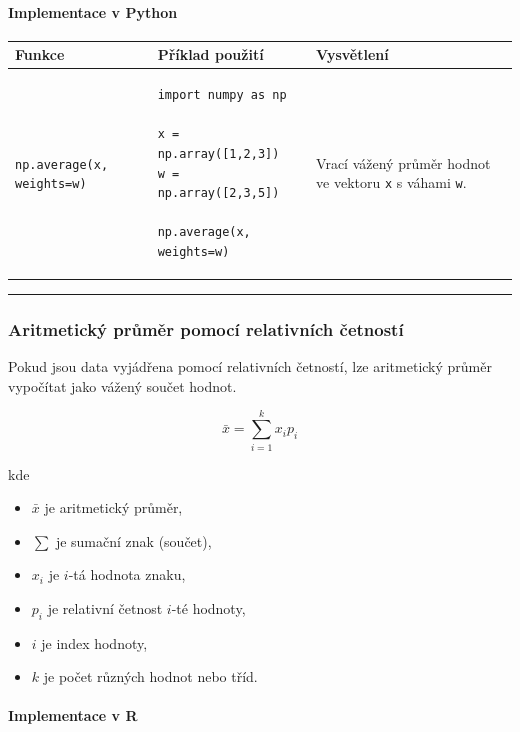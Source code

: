 \documentclass[a4paper, 11pt]{article}
\newenvironment{funkcedict}
{%
  \begingroup
  \renewcommand{\arraystretch}{1.4}%
  \lstset{basicstyle=\ttfamily\small, columns=fullflexible}%
  \setlength{\tabcolsep}{4pt}%
  \begin{tabular}{p{0.19\textwidth} p{0.38\textwidth} p{0.30\textwidth}}
  \textbf{Funkce} & \textbf{Příklad použití} & \textbf{Vysvětlení} \\
  \midrule
}
{%
  \end{tabular}%
  \endgroup
}
\begin{document}
\paragraph{Implementace v Python}\mbox{}\par

\begin{funkcedict}

	\texttt{np.average(x, weights=w)} &
	\begin{lstlisting}
import numpy as np

x = np.array([1,2,3])
w = np.array([2,3,5])

np.average(x, weights=w)
	\end{lstlisting}
	&
	Vrací vážený průměr hodnot ve vektoru \texttt{x} s váhami \texttt{w}.
	\\

\end{funkcedict}

\noindent\hrule\medskip

\subsubsection{Aritmetický průměr pomocí relativních četností}

Pokud jsou data vyjádřena pomocí relativních četností,
lze aritmetický průměr vypočítat jako vážený součet hodnot.

\begin{equation*}
	\bar{x} = \sum_{i=1}^{k} x_i p_i
\end{equation*}

kde

\begin{itemize}[noitemsep]
	\item $\bar{x}$ je aritmetický průměr,
	\item $\sum$ je sumační znak (součet),
	\item $x_i$ je $i$-tá hodnota znaku,
	\item $p_i$ je relativní četnost $i$-té hodnoty,
	\item $i$ je index hodnoty,
	\item $k$ je počet různých hodnot nebo tříd.
\end{itemize}

\paragraph{Implementace v R}\mbox{}\par
\end{document}
